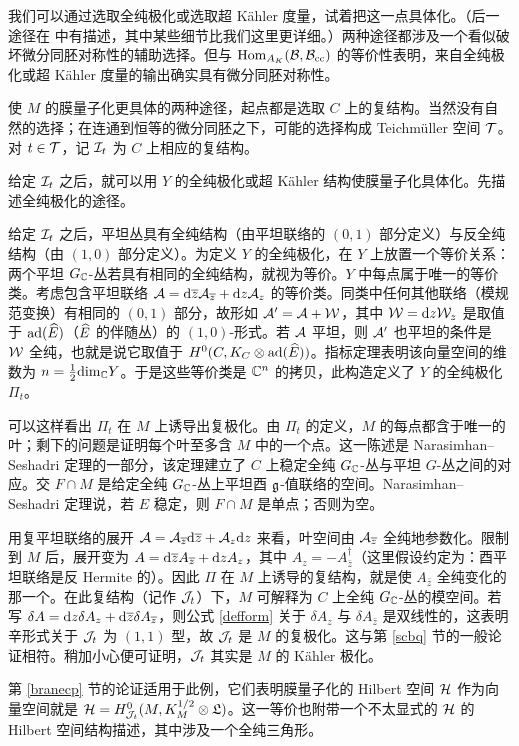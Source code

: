 我们可以通过选取全纯极化或选取超 Kähler 度量，试着把这一点具体化。（后一途径在 \cite{GW} 中有描述，其中某些细节比我们这里更详细。）两种途径都涉及一个看似破坏微分同胚对称性的辅助选择。但与 ${\mathrm{Hom}}_{A_K}({\mathcal B},{\mathcal B}_{\mathrm{cc}})$ 的等价性表明，来自全纯极化或超 Kähler 度量的输出确实具有微分同胚对称性。

使 $M$ 的膜量子化更具体的两种途径，起点都是选取 $C$ 上的复结构。当然没有自然的选择；在连通到恒等的微分同胚之下，可能的选择构成 Teichmüller 空间 ${\mathcal T}$。对 $t\in{\mathcal T}$，记 ${\mathcal I}_t$ 为 $C$ 上相应的复结构。

给定 ${\mathcal I}_t$ 之后，就可以用 $Y$ 的全纯极化或超 Kähler 结构使膜量子化具体化。先描述全纯极化的途径。

给定 ${\mathcal I}_t$ 之后，平坦丛具有全纯结构（由平坦联络的 $(0,1)$ 部分定义）与反全纯结构（由 $(1,0)$ 部分定义）。为定义 $Y$ 的全纯极化，在 $Y$ 上放置一个等价关系：两个平坦 $G_{\mathbb C}$-丛若具有相同的全纯结构，就视为等价。$Y$ 中每点属于唯一的等价类。考虑包含平坦联络 ${\mathcal A}={\mathrm d}\overline z{\mathcal A}_{\overline z}+{\mathrm d} z{\mathcal A}_z$ 的等价类。同类中任何其他联络（模规范变换）有相同的 $(0,1)$ 部分，故形如
${\mathcal A}'={\mathcal A}+{\mathcal W}$，其中 ${\mathcal W}={\mathrm d} z{\mathcal W}_z$ 是取值于 ${\mathrm{ad}}(\widehat E)$（$\widehat E$ 的伴随丛）的 $(1,0)$-形式。若 ${\mathcal A}$ 平坦，则 ${\mathcal A}'$ 也平坦的条件是 ${\mathcal W}$ 全纯，也就是说它取值于 $H^0(C,K_C\otimes{\mathrm{ad}}(\widehat E))$。指标定理表明该向量空间的维数为 $n=\frac12{\mathrm{dim}}_{\mathbb C} Y$。于是这些等价类是 ${\mathbb C}^n$ 的拷贝，此构造定义了 $Y$ 的全纯极化 $\varPi_t$。

可以这样看出 $\varPi_t$ 在 $M$ 上诱导出复极化。由 $\varPi_t$ 的定义，$M$ 的每点都含于唯一的叶；剩下的问题是证明每个叶至多含 $M$ 中的一个点。这一陈述是 Narasimhan--Seshadri 定理的一部分，该定理建立了 $C$ 上稳定全纯 $G_{\mathbb C}$-丛与平坦 $G$-丛之间的对应。交 $F\cap M$ 是给定全纯 $G_{\mathbb C}$-丛上平坦酉 ${\mathfrak g}$-值联络的空间。Narasimhan--Seshadri 定理说，若 $E$ 稳定，则 $F\cap M$ 是单点；否则为空。

用复平坦联络的展开 ${\mathcal A}={\mathcal A}_{\overline z}{\mathrm d}\overline z+{\mathcal A}_z{\mathrm d} z$ 来看，叶空间由 ${\mathcal A}_{\overline z}$ 全纯地参数化。限制到 $M$ 后，展开变为 $A={\mathrm d}\overline zA_{\overline z}+{\mathrm d} zA_z$，其中 $A_z=-A_{\bar z}^\dagger$（这里假设约定为：酉平坦联络是反 Hermite 的）。因此 $\varPi$ 在 $M$ 上诱导的复结构，就是使 $A_{\bar z}$ 全纯变化的那一个。在此复结构（记作 ${\mathcal J}_t$）下，$M$ 可解释为 $C$ 上全纯 $G_{\mathbb C}$-丛的模空间。若写 $\delta A={\mathrm d} z\delta A_z+{\mathrm d}\overline z\delta A_{\overline z}$，则公式 \eqref{defform} 关于 $\delta A_z$ 与 $\delta A_{\bar z}$ 是双线性的，这表明辛形式关于 ${\mathcal J}_t$ 为 $(1,1)$ 型，故 ${\mathcal J}_t$ 是 $M$ 的复极化。这与第 \ref{scbq} 节的一般论证相符。稍加小心便可证明，${\mathcal J}_t$ 其实是 $M$ 的 Kähler 极化。

第 \ref{branecp} 节的论证适用于此例，它们表明膜量子化的 Hilbert 空间 ${\mathcal H}$ 作为向量空间就是
${\mathcal H}=H^0_{{\mathcal J}_t}(M,K_M^{1/2}\otimes{\mathfrak L})$。这一等价也附带一个不太显式的 ${\mathcal H}$ 的 Hilbert 空间结构描述，其中涉及一个全纯三角形。

